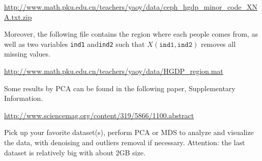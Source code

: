 \documentclass[11pt]{article}
\begin{document}
\begin{enumerate}
\url{http://www.math.pku.edu.cn/teachers/yaoy/data/ceph_hgdp_minor_code_XNA.txt.zip}

Moreover, the following file contains the region where each people comes from, as well as two variables {\texttt{ind1}} and{\texttt{ind2}} such that $X({\texttt{ind1}},{\texttt{ind2}})$ removes all missing values. 

\url{http://www.math.pku.edu.cn/teachers/yaoy/data/HGDP_region.mat}

Some results by PCA can be found in the following paper, Supplementary Information. 

\url{http://www.sciencemag.org/content/319/5866/1100.abstract}

\end{enumerate}

Pick up your favorite dataset(s), perform PCA or MDS to analyze and visualize the data, with denoising and outliers removal if necessary. Attention: the last dataset is relatively big with about 2GB size. 
\end{document}
